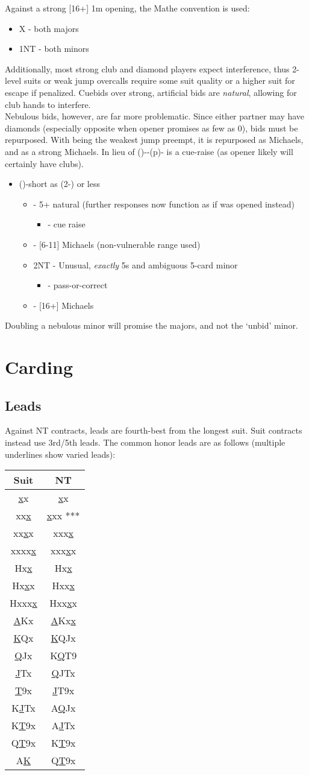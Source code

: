 \documentclass[12pt]{report}
\newcommand{\n}{\\}
\newcommand{\ul}[1]{\begin{itemize}#1\end{itemize}}
\newcommand{\li}{\item[~]}
\begin{document}
    Against a strong [16+] 1m opening, the Mathe convention is used:

    \ul {
        \li X - both majors
        \li 1NT - both minors
    }

    Additionally, most strong club and diamond players expect interference, thus 2-level suits or weak jump overcalls require some suit quality or a higher suit for escape if penalized.  Cuebids over strong, artificial bids are \textit{natural}, allowing for club hands to interfere.\n

    Nebulous bids, however, are far more problematic.  Since either partner may have diamonds (especially opposite when opener promises as few as 0), bids must be repurposed.  With  being the weakest jump preempt, it is repurposed as Michaels, and  as a strong Michaels.  In lieu of ()--(p)- is a cue-raise (as opener likely will certainly have clubs).
    
    \ul {
        \li ()-short as (2-) or less
        \ul {
            \li \di2 - 5+ natural (further responses now function as if \cl1 was opened instead)
            \ul {
                \li \cl3 - cue raise
            }
            \li \he2 - [6-11] Michaels (non-vulnerable range used)
            \li 2NT - Unusual, \textit{exactly} 5\he{}s and ambiguous 5-card minor
            \ul {
                \li \cl3 - pass-or-correct
            }
            \li \di3 - [16+] Michaels
        }
    }

    Doubling a nebulous minor will promise the majors, and not the `unbid' minor.

\chapter{Carding} \label{5}

\section{Leads}

    Against NT contracts, leads are fourth-best from the longest suit.  Suit contracts instead use 3rd/5th leads. The common honor leads are as follows (multiple underlines show varied leads):

    \newcommand{\uu}[1]{\underline{#1}}
    \begin{center}
        \begin{tabular}{ |c|c| } 
            \hline
            Suit & NT \n
            \hline
            \uu{x}x & \uu{x}x\n
            xx\uu{x} & \uu{x}xx ***\n
            xx\uu{x}x & xxx\uu{x}\n
            xxxx\uu{x} & xxx\uu{x}x\n
            Hx\uu{x} & Hx\uu{x}\n
            Hx\uu{x}x & Hxx\uu{x}\n
            Hxxx\uu{x} & Hxx\uu{x}x\n
            \uu{A}Kx & \uu{A}Kx\uu{x}\n
            \uu{K}Qx & \uu{K}QJx\n
            \uu{Q}Jx & K\uu{Q}T9\n
            \uu{J}Tx & \uu{Q}JTx\n
            \uu{T}9x & \uu{J}T9x\n
            K\uu{J}Tx & A\uu{Q}Jx\n
            K\uu{T}9x & A\uu{J}Tx\n
            Q\uu{T}9x & K\uu{T}9x\n
            A\uu{K} & Q\uu{T}9x\n
            \hline
        \end{tabular}
    \end{center}
\end{document}
